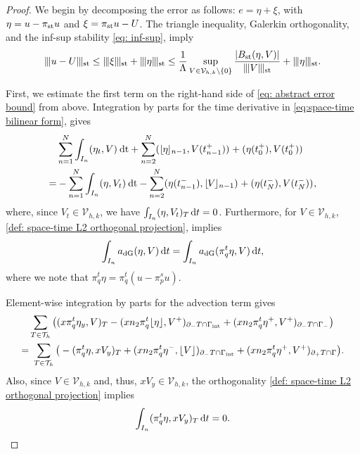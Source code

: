 \documentclass{amsart}
\newcommand{\ud}{\,{\rm d}}
\newcommand{\tjump}[1]{\lfloor\kern-0.4mm{#1}\kern-0.4mm\rfloor}
\newcommand{\inner}[3]{({#1},{#2})_{{#3}}}
\newcommand{\Th}{\mathcal{T}_h}
\newcommand{\gint}{\Gamma_{\rm int}}
\newcommand{\gif}{\Gamma_-}
\newcommand{\ndg}[1]{|\kern-.03cm \|{#1}|\kern-.03cm \|}
\newcommand{\normal}{{n}}
\newcommand{\jumpu}[1]{ \lfloor #1 \rfloor }
\newcommand{\dt}{\,{\rm dt}}
\theoremstyle{definition}
\theoremstyle{remark}
\numberwithin{equation}{section}
\begin{document}
\begin{proof}
	We begin by decomposing the error as follows: $e = \eta + \xi$, with $\eta= u - \pi_{\rm st}u$ and $\xi= \pi_{\rm st}u - U$. The triangle inequality, Galerkin orthogonality, and the inf-sup stability \eqref{eq: inf-sup}, imply
	\begin{equation}\label{eq: abstract error bound}
		\begin{split}
			\ndg{u-U}_{\rm st} \leq \ndg{\xi}_{\rm st} + \ndg{\eta}_{\rm st}
			\leq \frac{1}{\Lambda}  \sup_{V\in  {\mathcal{V}}_{h,k}\backslash \{0\}} \frac{|B_{\rm st}(\eta,V)|}{\ndg{V}_{\rm st}}
			+\ndg{\eta}_{\rm st}.
		\end{split}
	\end{equation}


First, we estimate the first term on the right-hand side of \eqref{eq: abstract error bound} from above.
Integration by parts for the time derivative in \eqref{eq:space-time bilinear form}, gives
\begin{equation*}
\begin{split}
&   \sum_{n=1}^N \int_{I_n} \inner{\eta_t}{V }{} \dt + \sum_{n=2}^{N} \inner{\tjump{\eta}_{n-1}}{V ( t_{n-1}^+)}{}
+	\inner{\eta(t_0^+)}{V (t_0^+)}{} \\
=&  -\sum_{n=1}^N \int_{I_n} \inner{\eta}{V _t}{} \dt - \sum_{n=2}^{N} \inner{\eta( t_{n-1}^-)}{\tjump{V }_{n-1}}{}
+	\inner{\eta(t_N^-)}{V (t_N^-)}{},
\end{split}
\end{equation*}
where, since $ V_t \in  {\mathcal{V}}_{h,k}$,  we have  $\int_{I_n}
\inner{\eta}{V_t}{T}
\ud t = 0$.
Furthermore, for $V  \in  {\mathcal{V}}_{h,k}$, \eqref{def: space-time L2 orthogonal projection}, implies
\[
\int_{I_n} a_{\rm dG}(\eta,V ) \ud t =  \int_{I_n} a_{\rm dG}(\pi_q^t\eta,V ) \ud t,
\]
where we note that $\pi_q^t\eta = \pi_q^t(u-\pi_p^s u)$.

Element-wise integration by parts for the advection term gives
\begin{equation*}
	\begin{aligned}
		&	\sum_{T \in \Th} \big( \inner{x \pi_q^t\eta_y}{V}{T}-
		\inner{x\normal_2 \pi_q^t\jumpu{\eta}}{V^+}{\partial_- T \cap \gint}
		+
		\inner{x\normal_2 \pi_q^t\eta^+ }{ V^+ }{\partial_- T \cap \gif} \big)\\
		=& \  	\sum_{T \in \Th} \big(- \inner{\pi_q^t\eta}{x V_y}{T}  +  \inner{x\normal_2  \pi_q^t\eta^-}{ \jumpu{V}}{\partial_- T \cap \gint}
		+
		\inner{x\normal_2 \pi_q^t\eta^+ }{ V^+ }{\partial_+ T \cap \Gamma}
		\big).
	\end{aligned}
\end{equation*}
Also, since $V  \in  {\mathcal{V}}_{h,k}$ and, thus, $x V _y \in  {\mathcal{V}}_{h,k}$, the orthogonality \eqref{def: space-time L2 orthogonal projection} implies
\begin{equation*}
	\int_{I_n}
	\inner{\pi_q^t\eta}{x V _y}{T}
	\ud t = 0.
\end{equation*}



\end{proof}
\end{document}
